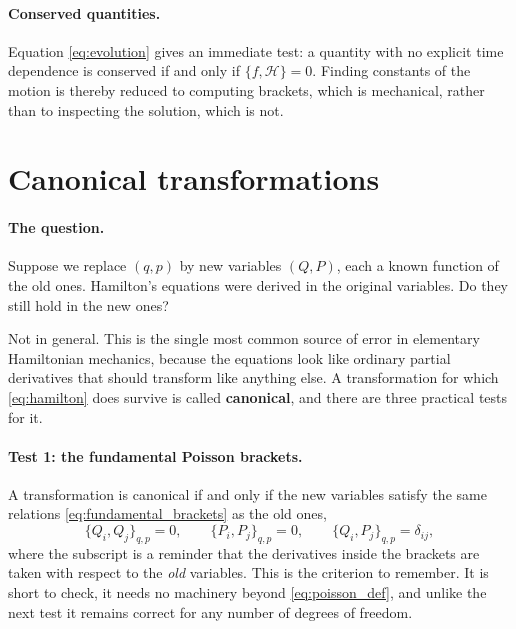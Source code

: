 \documentclass[12pt]{article}
\newcommand{\Ham}{\mathcal{H}}
\newcommand{\pb}[2]{\{#1,#2\}}
\begin{document}
\paragraph{Conserved quantities.}  Equation \eqref{eq:evolution} gives
an immediate test: a quantity with no explicit time dependence is
conserved if and only if $\pb{f}{\Ham} = 0$.  Finding constants of the
motion is thereby reduced to computing brackets, which is mechanical,
rather than to inspecting the solution, which is not.

\section{Canonical transformations}
\label{sec:canonical}

\paragraph{The question.}  Suppose we replace $(q,p)$ by new variables
$(Q,P)$, each a known function of the old ones.  Hamilton's equations
were derived in the original variables.  Do they still hold in the new
ones?

Not in general.  This is the single most common source of error in
elementary Hamiltonian mechanics, because the equations look like
ordinary partial derivatives that should transform like anything else.
A transformation for which \eqref{eq:hamilton} does survive is called
\textbf{canonical}, and there are three practical tests for it.

\paragraph{Test 1: the fundamental Poisson brackets.}  A
transformation is canonical if and only if the new variables satisfy
the same relations \eqref{eq:fundamental_brackets} as the old ones,
%
\begin{equation}
  \pb{Q_i}{Q_j}_{q,p} = 0 ,
  \qquad
  \pb{P_i}{P_j}_{q,p} = 0 ,
  \qquad
  \pb{Q_i}{P_j}_{q,p} = \delta_{ij} ,
  \label{eq:canonical_test_pb}
\end{equation}
%
where the subscript is a reminder that the derivatives inside the
brackets are taken with respect to the \emph{old} variables.  This is
the criterion to remember.  It is short to check, it needs no
machinery beyond \eqref{eq:poisson_def}, and unlike the next test it
remains correct for any number of degrees of freedom.
\end{document}
